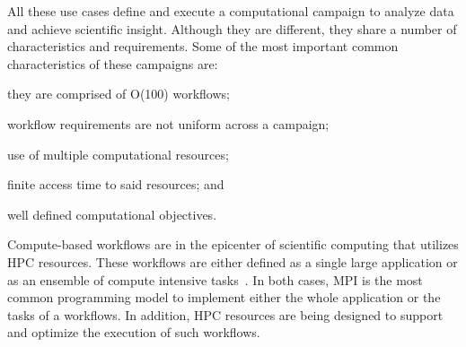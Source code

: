All these use cases define and execute a computational campaign to analyze data and achieve scientific insight.
Although they are different, they share a number of characteristics and requirements.
Some of the most important common characteristics of these campaigns are:
\begin{inparaenum}[(1)]
    \item they are comprised of O(100) workflows;
    \item workflow requirements are not uniform across a campaign;
    \item use of multiple computational resources;
    \item finite access time to said resources; and
    \item well defined computational objectives.
\end{inparaenum}


Compute-based workflows are in the epicenter of scientific computing that utilizes HPC resources.
These workflows are either defined as a single large application or as an ensemble of compute intensive tasks~\cite{balasubramanian2018harnessing}.
In both cases, MPI is the most common programming model to implement either the whole application or the tasks of a workflows.
In addition, HPC resources are being designed to support and optimize the execution of such workflows.

